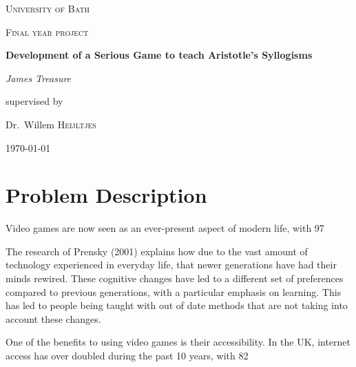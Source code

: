 \documentclass[12pt,a4paper]{report}
\begin{document}
\begin{titlepage}
	\centering
	{\scshape\LARGE University of Bath \par}
	\vspace{1cm}
	{\scshape\Large Final year project\par}
	\vspace{1.5cm}
	{\huge\bfseries Development of a Serious Game to teach Aristotle's Syllogisms\par}
	\vspace{2cm}
	{\Large\itshape James Treasure\par}
	\vfill
	supervised by\par
	Dr.~Willem \textsc{Heijltjes}
	\vfill
	{\large \today\par}
\end{titlepage}

\tableofcontents
\chapter{Problem Description}
Video games are now seen as an ever-present aspect of modern life, with 97%

The research of Prensky (2001) explains how due to the vast amount of technology experienced in everyday life, that newer generations have had their minds rewired. These cognitive changes have led to a different set of preferences compared to previous generations, with a particular emphasis on learning. This has led to people being taught with out of date methods that are not taking into account these changes.

One of the benefits to using video games is their accessibility. In the UK, internet access has over doubled during the past 10 years, with 82%
\end{document}
